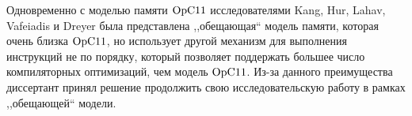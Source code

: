 Одновременно с моделью памяти $\mathrm{OpC11}$ исследователями Kang, Hur, Lahav, Vafeiadis и Dreyer была представлена ,,обещающая`` модель
памяти, которая очень близка $\mathrm{OpC11}$, но использует другой механизм для выполнения инструкций не по порядку, который позволяет
поддержать большее число компиляторных оптимизаций, чем модель $\mathrm{OpC11}$.
Из-за данного преимущества диссертант принял решение продолжить свою исследовательскую работу в рамках ,,обещающей`` модели.




